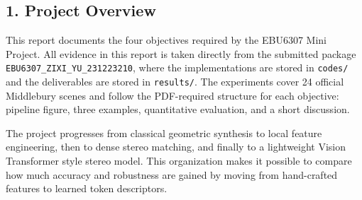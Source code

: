 \documentclass[
  11pt,
]{article}
\begin{document}
\newcommand{\siftexamplerow}[9]{%
\begin{minipage}[t]{0.98\linewidth}
\centering
\annotatedexampleimage[0.49\linewidth]{#1}{#2}{#3}\hfill
\annotatedexampleimage[0.49\linewidth]{#4}{#5}{#6}\\[0.45em]
\annotatedexampleimage[\linewidth]{#7}{#8}{#9}
\end{minipage}\par
}
\newcommand{\siftexamplerowsmall}[9]{%
\begin{minipage}[t]{0.72\linewidth}
\centering
\annotatedexampleimage[0.49\linewidth]{#1}{#2}{#3}\hfill
\annotatedexampleimage[0.49\linewidth]{#4}{#5}{#6}\\[0.45em]
\annotatedexampleimage[\linewidth]{#7}{#8}{#9}
\end{minipage}\par
}

\subsection{1. Project Overview}\label{project-overview}

This report documents the four objectives required by the EBU6307 Mini
Project. All evidence in this report is taken directly from the
submitted package \texttt{EBU6307\_ZIXI\_YU\_231223210}, where the
implementations are stored in \texttt{codes/} and the deliverables are
stored in \texttt{results/}. The experiments cover 24 official
Middlebury scenes and follow the PDF-required structure for each
objective: pipeline figure, three examples, quantitative evaluation, and
a short discussion.

The project progresses from classical geometric synthesis to local
feature engineering, then to dense stereo matching, and finally to a
lightweight Vision Transformer style stereo model. This organization
makes it possible to compare how much accuracy and robustness are gained
by moving from hand-crafted features to learned token descriptors.
\end{document}
